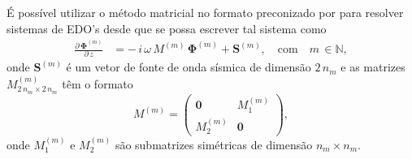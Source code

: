 %
\'E poss\'ivel utilizar o m\'etodo matricial no formato preconizado por \cite{Ursin-1983} para resolver sistemas de EDO's desde que se possa escrever tal sistema como
\begin{align}\label{eq.matricial}
\frac{\partial\,\mathbf{\Phi}^{(m)}}{\partial\,z} &= -\,i\,\omega\,M^{(m)}\,\mathbf{\Phi}^{(m)}+\mathbf{S}^{(m)},\quad\text{com}\quad m\,\in\mathbb{N},
\end{align}
onde $\mathbf{S}^{(m)}$ \'e um vetor de fonte de onda s\'ismica de dimens\~ao $2\,n_m$ e as matrizes $M^{(m)}_{2\,n_m\times2\,n_m}$ t\^em o formato
\begin{equation}\label{eq.matriz_M}
M^{(m)}
=
\begin{pmatrix}
\mathbf{0}&M_1^{(m)}\\
M_2^{(m)}&\mathbf{0}
\end{pmatrix},
\end{equation}
onde $M_1^{(m)}$ e $M_2^{(m)}$ s\~ao submatrizes sim\'etricas de dimens\~ao $n_m\times n_m$.

